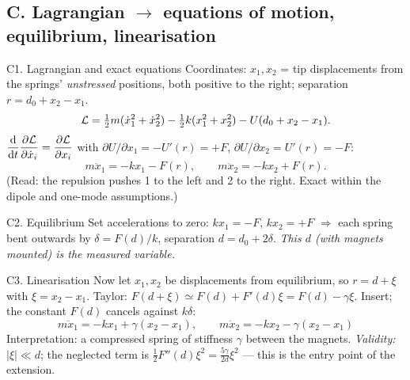 \documentclass[11pt,a4paper]{article}
\begin{document}
\subsection*{C. Lagrangian $\to$ equations of motion, equilibrium, linearisation}
\begin{stepbox}{C1. Lagrangian and exact equations}
Coordinates: $x_1,x_2$ = tip displacements from the springs' \emph{unstressed} positions, both positive to the right; separation $r=d_0+x_2-x_1$.
\[ \mathcal L=\tfrac12m(\dot x_1^2+\dot x_2^2)-\tfrac12k(x_1^2+x_2^2)-U(d_0+x_2-x_1). \]
$\dfrac{\mathrm{d}}{\mathrm{d} t}\dfrac{\partial\mathcal L}{\partial\dot x_i}=\dfrac{\partial\mathcal L}{\partial x_i}$ with $\partial U/\partial x_1=-U'(r)=+F$, $\partial U/\partial x_2=U'(r)=-F$:
\[ m\ddot x_1=-kx_1-F(r),\qquad m\ddot x_2=-kx_2+F(r). \]
(Read: the repulsion pushes 1 to the left and 2 to the right. Exact within the dipole and one-mode assumptions.)
\end{stepbox}
\begin{stepbox}{C2. Equilibrium}
Set accelerations to zero: $kx_1=-F$, $kx_2=+F$ $\Rightarrow$ each spring bent outwards by $\delta=F(d)/k$, separation $d=d_0+2\delta$. \textit{This $d$ (with magnets mounted) is the measured variable.}
\end{stepbox}
\begin{stepbox}{C3. Linearisation}
Now let $x_1,x_2$ be displacements from equilibrium, so $r=d+\xi$ with $\xi=x_2-x_1$. Taylor: $F(d+\xi)\simeq F(d)+F'(d)\xi=F(d)-\gamma\xi$. Insert; the constant $F(d)$ cancels against $k\delta$:
\[ \boxed{m\ddot x_1=-kx_1+\gamma(x_2-x_1),\qquad m\ddot x_2=-kx_2-\gamma(x_2-x_1)} \]
Interpretation: a compressed spring of stiffness $\gamma$ between the magnets. \textit{Validity:} $|\xi|\ll d$; the neglected term is $\tfrac12F''(d)\xi^2=\tfrac{5\gamma}{2d}\xi^2$ --- this is the entry point of the extension.
\end{stepbox}
\end{document}
